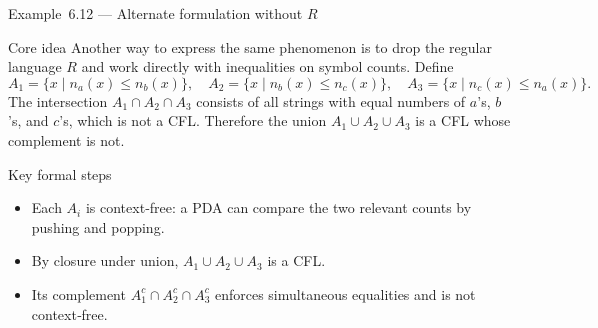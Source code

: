 \begin{frame}[t]{Example 6.12 — Alternate formulation without $R$}
  \begin{tblock}{Core idea}
    Another way to express the same phenomenon is to drop the regular
    language $R$ and work directly with inequalities on symbol counts.
    Define
    \[
      A_1 = \{x \mid n_a(x) \le n_b(x)\},\quad
      A_2 = \{x \mid n_b(x) \le n_c(x)\},\quad
      A_3 = \{x \mid n_c(x) \le n_a(x)\}.
    \]
    The intersection $A_1 \cap A_2 \cap A_3$ consists of all strings
    with equal numbers of $a$’s, $b$’s, and $c$’s, which is not a CFL.
    Therefore the union $A_1 \cup A_2 \cup A_3$ is a CFL whose
    complement is not.
  \end{tblock}
  \begin{tblock}{Key formal steps}
    \begin{itemize}
      \item Each $A_i$ is context‑free: a PDA can compare the two
        relevant counts by pushing and popping.
      \item By closure under union, $A_1 \cup A_2 \cup A_3$ is a CFL.
      \item Its complement $A_1^c \cap A_2^c \cap A_3^c$ enforces
        simultaneous equalities and is not context‑free.
    \end{itemize}
  \end{tblock}
  \label{fr:6.2-10}
\end{frame}

